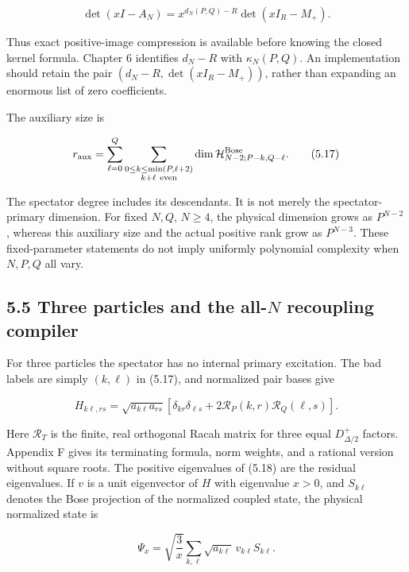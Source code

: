 \documentclass[a4paper,11pt]{article}
\numberwithin{equation}{section}
\begin{document}
\[
\det(xI-A_N)=x^{d_N(P,Q)-R}\det(xI_R-M_+).
\tag{5.16}
\]

Thus exact positive-image compression is available before knowing the closed kernel formula. Chapter 6 identifies \(d_N-R\) with \(\kappa_N(P,Q)\). An implementation should retain the pair \((d_N-R,\det(xI_R-M_+))\), rather than expanding an enormous list of zero coefficients.

The auxiliary size is

\[
r_{\rm aux}=
\sum_{\ell=0}^{Q}
\sum_{\substack{0\le k\le\min(P,\ell+2)\\k+\ell\ \mathrm{even}}}
\dim\mathcal H^{\rm Bose}_{N-2;P-k,Q-\ell}.
\tag{5.17}
\]

The spectator degree includes its descendants. It is not merely the spectator-primary dimension. For fixed \(N,Q\), \(N\ge4\), the physical dimension grows as \(P^{N-2}\), whereas this auxiliary size and the actual positive rank grow as \(P^{N-3}\). These fixed-parameter statements do not imply uniformly polynomial complexity when \(N,P,Q\) all vary.

\hypertarget{three-particles-and-the-all-n-recoupling-compiler}{%
\subsection{\texorpdfstring{5.5 Three particles and the all-\(N\) recoupling compiler}{5.5 Three particles and the all-N recoupling compiler}}\label{three-particles-and-the-all-n-recoupling-compiler}}

For three particles the spectator has no internal primary excitation. The bad labels are simply \((k,\ell)\) in (5.17), and normalized pair bases give

\[
H_{k\ell,rs}=\sqrt{a_{k\ell}a_{rs}}
\left[\delta_{kr}\delta_{\ell s}+2\mathcal R_P(k,r)\mathcal R_Q(\ell,s)\right].
\tag{5.18}
\]

Here \(\mathcal R_T\) is the finite, real orthogonal Racah matrix for three equal \(D^+_{\Delta/2}\) factors. Appendix F gives its terminating formula, norm weights, and a rational version without square roots. The positive eigenvalues of (5.18) are the residual eigenvalues. If \(v\) is a unit eigenvector of \(H\) with eigenvalue \(x>0\), and \(S_{k\ell}\) denotes the Bose projection of the normalized coupled state, the physical normalized state is

\[
\Psi_x=\sqrt{\frac3x}\sum_{k,\ell}\sqrt{a_{k\ell}}\,v_{k\ell}S_{k\ell}.
\tag{5.19}
\]
\end{document}
